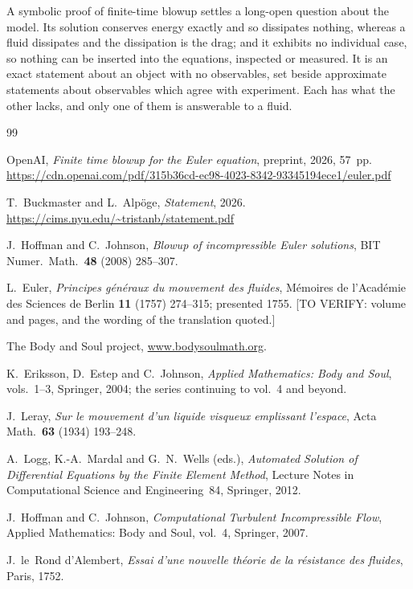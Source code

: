 \documentclass[11pt]{article}
\begin{document}
A symbolic proof of finite-time blowup settles a long-open question about the model. Its solution
conserves energy exactly and so dissipates nothing, whereas a fluid dissipates and the dissipation is
the drag; and it exhibits no individual case, so nothing can be inserted into the equations,
inspected or measured. It is an exact statement about an object with no observables, set beside
approximate statements about observables which agree with experiment. Each has what the other lacks,
and only one of them is answerable to a fluid.

\begin{thebibliography}{99}

 OpenAI, \emph{Finite time blowup for the Euler equation}, preprint, 2026,
57~pp.
\newblock \url{https://cdn.openai.com/pdf/315b36cd-ec98-4023-8342-93345194ece1/euler.pdf}

 T.~Buckmaster and L.~Alp\"oge, \emph{Statement}, 2026.
\newblock \url{https://cims.nyu.edu/~tristanb/statement.pdf}

 J.~Hoffman and C.~Johnson, \emph{Blowup of incompressible Euler solutions},
BIT Numer.\ Math.\ \textbf{48} (2008) 285--307.

 L.~Euler, \emph{Principes g\'en\'eraux du mouvement des fluides},
M\'emoires de l'Acad\'emie des Sciences de Berlin \textbf{11} (1757) 274--315; presented 1755.
[TO VERIFY: volume and pages, and the wording of the translation quoted.]

 The Body and Soul project, \url{www.bodysoulmath.org}.

 K.~Eriksson, D.~Estep and C.~Johnson, \emph{Applied Mathematics: Body and Soul},
vols.~1--3, Springer, 2004; the series continuing to vol.~4 and beyond.

 J.~Leray, \emph{Sur le mouvement d'un liquide visqueux emplissant l'espace},
Acta Math.\ \textbf{63} (1934) 193--248.

 A.~Logg, K.-A.~Mardal and G.~N.~Wells (eds.), \emph{Automated Solution of
Differential Equations by the Finite Element Method}, Lecture Notes in Computational Science and
Engineering~84, Springer, 2012.

 J.~Hoffman and C.~Johnson, \emph{Computational Turbulent Incompressible Flow},
Applied Mathematics: Body and Soul, vol.~4, Springer, 2007.

 J.~le~Rond d'Alembert, \emph{Essai d'une nouvelle th\'eorie de la
r\'esistance des fluides}, Paris, 1752.


\end{thebibliography}
\end{document}
